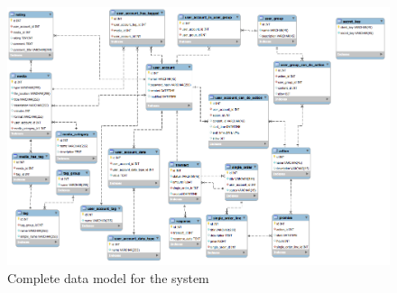 \documentclass[11pt]{article}
\begin{document}
\begin{figure}[h!]
  \caption{Complete data model for the system}
  \centering
    \includegraphics[width=1\textwidth, angle=270]{images/data_model_final.png}
\end{figure}

\newpage
\end{document}

